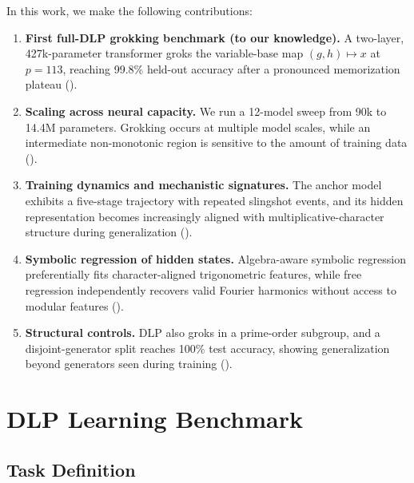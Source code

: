 \documentclass[twoside,11pt]{article}
\begin{document}
In this work, we make the following contributions:

\begin{enumerate}[leftmargin=*]
    \item \textbf{First full-DLP grokking benchmark (to our knowledge).} A two-layer, 427k-parameter transformer groks the variable-base map $(g,h)\mapsto x$ at $p=113$, reaching 99.8\% held-out accuracy after a pronounced memorization plateau ().

    \item \textbf{Scaling across neural capacity.} We run a 12-model sweep from 90k to 14.4M parameters. Grokking occurs at multiple model scales, while an intermediate non-monotonic region is sensitive to the amount of training data ().

    \item \textbf{Training dynamics and mechanistic signatures.} The anchor model exhibits a five-stage trajectory with repeated slingshot events, and its hidden representation becomes increasingly aligned with multiplicative-character structure during generalization ().

    \item \textbf{Symbolic regression of hidden states.} Algebra-aware symbolic regression preferentially fits character-aligned trigonometric features, while free regression independently recovers valid Fourier harmonics without access to modular features ().

    \item \textbf{Structural controls.} DLP also groks in a prime-order subgroup, and a disjoint-generator split reaches 100\% test accuracy, showing generalization beyond generators seen during training ().
\end{enumerate}


\section{DLP Learning Benchmark}
\label{sec:benchmark}

\subsection{Task Definition}
\end{document}
